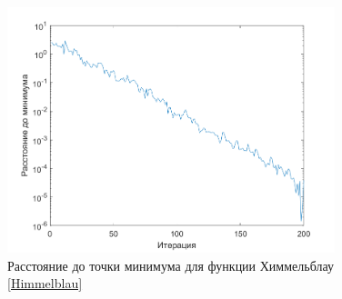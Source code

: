 \begin{figure}[H]
\centering
\includegraphics[width=0.85\textwidth]{Graphics/Himmelblau_dist_to_min.png}
\caption{Расстояние до точки минимума для функции Химмельблау \eqref{Himmelblau}} 
\end{figure}